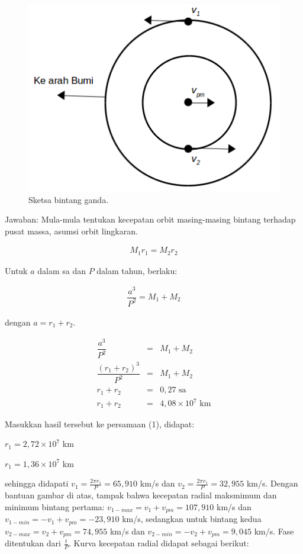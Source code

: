 \documentclass[11pt,fleqn]{exam}
\begin{document}
\begin{questions}
\begin{figure}[H]
\centering
\includegraphics[scale=0.55]{bintang-ganda.png}
\caption{Sketsa bintang ganda.}
\end{figure}

Jawaban:
Mula-mula tentukan kecepatan orbit masing-masing bintang terhadap pusat massa, asumsi orbit lingkaran.

\begin{eqnarray}
M_1 r_1=M_2 r_2
\end{eqnarray}

Untuk $a$ dalam sa dan $P$ dalam tahun, berlaku:

\begin{eqnarray}
\dfrac{a^3}{P^2}=M_1+M_2
\end{eqnarray}

dengan $a=r_1+r_2$.

\begin{eqnarray*}
\dfrac{a^3}{P^2}&=&M_1+M_2\\
\dfrac{(r_1+r_2)^3}{P^2}&=&M_1+M_2\\
r_1+r_2&=&0,27 \text{  sa}\\
r_1+r_2&=&4,08\times10^7 \text{  km}
\end{eqnarray*}

Masukkan hasil tersebut ke persamaan (1), didapat:

$r_1=2,72\times10^7$ km

$r_1=1,36\times10^7$ km

sehingga didapati $v_1=\frac{2\pi r_1}{P}=65,910$ km/s dan $v_2=\frac{2\pi r_1}{P}=32,955$ km/s. Dengan bantuan gambar di atas, tampak bahwa kecepatan radial maksmimum dan minimum bintang pertama: $v_{1-max}=v_1+v_{pm}=107,910$ km/s dan $v_{1-min}=-v_1+v_{pm}= -23,910$ km/s, sedangkan untuk bintang kedua $v_{2-max}=v_2+v_{pm}=74,955$ km/s dan $v_{2-min}=-v_2+v_{pm}= 9,045$ km/s. Fase ditentukan dari $\frac{t}{P}$. Kurva kecepatan radial didapat sebagai berikut:


\end{questions}
\end{document}
